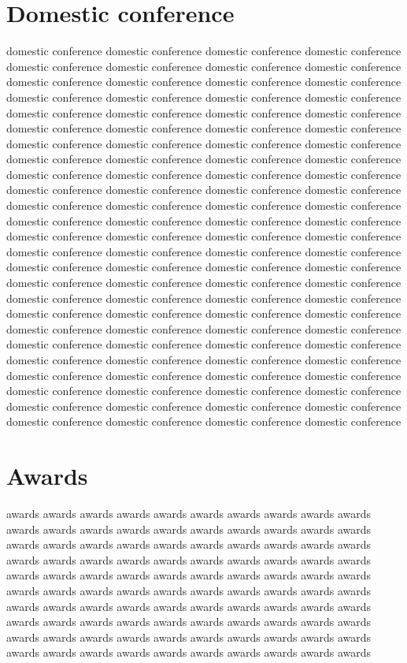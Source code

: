 \documentclass[12pt,a4paper,oneside,onecolumn,fleqn,dvipdfmx,report]{jsbook}
\begin{document}
\section*{Domestic conference}
domestic conference domestic conference domestic conference domestic conference domestic conference domestic conference domestic conference domestic conference domestic conference domestic conference domestic conference domestic conference domestic conference domestic conference domestic conference domestic conference domestic conference domestic conference domestic conference domestic conference domestic conference domestic conference domestic conference domestic conference domestic conference domestic conference domestic conference domestic conference domestic conference domestic conference domestic conference domestic conference domestic conference domestic conference domestic conference domestic conference domestic conference domestic conference domestic conference domestic conference domestic conference domestic conference domestic conference domestic conference domestic conference domestic conference domestic conference domestic conference domestic conference domestic conference domestic conference domestic conference domestic conference domestic conference domestic conference domestic conference domestic conference domestic conference domestic conference domestic conference domestic conference domestic conference domestic conference domestic conference domestic conference domestic conference domestic conference domestic conference domestic conference domestic conference domestic conference domestic conference domestic conference domestic conference domestic conference domestic conference domestic conference domestic conference domestic conference domestic conference domestic conference domestic conference domestic conference domestic conference domestic conference domestic conference domestic conference domestic conference domestic conference domestic conference domestic conference domestic conference domestic conference domestic conference domestic conference domestic conference domestic conference domestic conference domestic conference domestic conference

\section*{Awards}
awards awards awards awards awards awards awards awards awards awards awards awards awards awards awards awards awards awards awards awards awards awards awards awards awards awards awards awards awards awards awards awards awards awards awards awards awards awards awards awards awards awards awards awards awards awards awards awards awards awards awards awards awards awards awards awards awards awards awards awards awards awards awards awards awards awards awards awards awards awards awards awards awards awards awards awards awards awards awards awards awards awards awards awards awards awards awards awards awards awards awards awards awards awards awards awards awards awards awards awards
\end{document}
